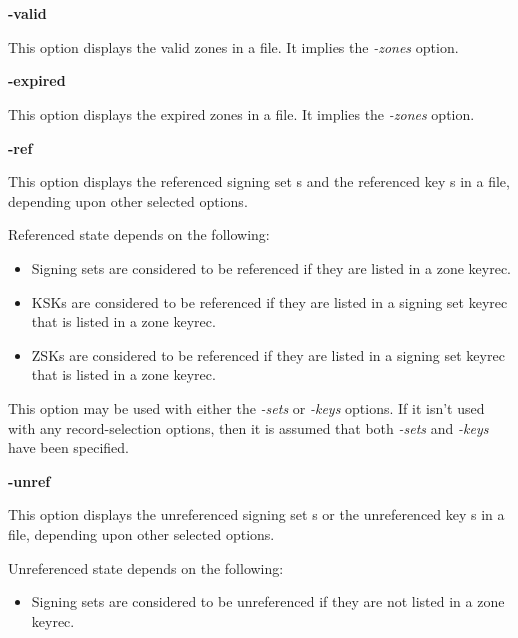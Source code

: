 \begin{description}

\item {\bf -valid}\verb" "

This option displays the valid zones in a  file.
It implies the {\it -zones} option.

\item {\bf -expired}\verb" "

This option displays the expired zones in a  file.
It implies the {\it -zones} option.

\item {\bf -ref}\verb" "

This option displays the referenced signing set s and the
referenced key s in a  file, depending upon
other selected options.

Referenced state depends on the following:

\begin{itemize}

\item Signing sets are considered to be referenced if they are listed in a
zone keyrec.

\item KSKs are considered to be referenced if they are listed in a signing set
keyrec that is listed in a zone keyrec.

\item ZSKs are considered to be referenced if they are listed in a signing set
keyrec that is listed in a zone keyrec.

\end{itemize}

This option may be used with either the {\it -sets} or {\it -keys} options.
If it isn't used with any record-selection options, then it is assumed that
both {\it -sets} and {\it -keys} have been specified.

\item {\bf -unref}\verb" "

This option displays the unreferenced signing set s or the
unreferenced key s in a  file, depending upon
other selected options.

Unreferenced state depends on the following:

\begin{itemize}

\item Signing sets are considered to be unreferenced if they are not listed in
a zone keyrec.


\end{itemize}
\end{description}
